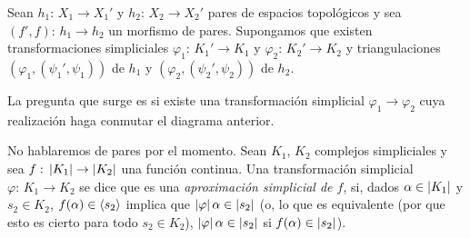 \theoremstyle{plain}
\newtheorem{teoExistenciaDeAproximaciones}{Teorema}[section]
\newtheorem{lemaDefinicionAproximacionSimplicial}%
	[teoExistenciaDeAproximaciones]{Lema}
\newtheorem{lemaAproximacionEsHomotopica}%
	[teoExistenciaDeAproximaciones]{Lema}
\newtheorem{teoCaracterizacionAproximacionesSimpliciales}%
	[teoExistenciaDeAproximaciones]{Teorema}
\newtheorem{coroAproximacionInducidaEnSubcomplejos}%
	[teoExistenciaDeAproximaciones]{Corolario}
\newtheorem{propoCaracterizacionDeAproximables}%
	[teoExistenciaDeAproximaciones]{Proposici\'{o}n}
\newtheorem{coroCaracterizacionDeAproximacionesPorSubdivision}%
	[teoExistenciaDeAproximaciones]{Corolario}

\theoremstyle{remark}
\newtheorem{obsDefinicionAproximacionSimplicial}%
	[teoExistenciaDeAproximaciones]{Observaci\'{o}n}
\newtheorem{obsAproximacionDeParesEsDePares}%
	[teoExistenciaDeAproximaciones]{Observaci\'{o}n}
\newtheorem{obsComposicionDeAproximacionesEsAproximacion}%
	[teoExistenciaDeAproximaciones]{Observaci\'{o}n}


Sean $h_{1}:\,X_{1}\rightarrow X_{1}'$ y $h_{2}:\,X_{2}\rightarrow X_{2}'$
pares de espacios topol\'{o}gicos y sea $(f',f):\,h_{1}\rightarrow h_{2}$ un
morfismo de pares. Supongamos que existen transformaciones simpliciales
$\varphi_{1}:\,K_{1}'\rightarrow K_{1}$ y
$\varphi_{2}:\,K_{2}'\rightarrow K_{2}$ y triangulaciones
$(\varphi_{1},(\psi_{1}',\psi_{1}))$ de $h_{1}$ y
$(\varphi_{2},(\psi_{2}',\psi_{2}))$ de $h_{2}$.
\begin{center}
\end{center}
La pregunta que surge es si existe una transformaci\'{o}n simplicial
$\varphi_{1}\rightarrow\varphi_{2}$ cuya realizaci\'{o}n haga conmutar el
diagrama anterior.

No hablaremos de pares por el momento. Sean $K_{1}$, $K_{2}$ complejos
simpliciales y sea $f:\,\left|K_{1}\right|\rightarrow\left|K_{2}\right|$ una funci\'{o}n
continua. Una transformaci\'{o}n simplicial $\varphi:\,K_{1}\rightarrow K_{2}$
se dice que es una \emph{aproximaci\'{o}n simplicial de $f$}, si, dados
$\alpha\in\left|K_{1}\right|$ y $s_{2}\in K_{2}$, $f(\alpha)\in\langle s_{2}\rangle$
implica que $\left|\varphi\right|\alpha\in\left|s_{2}\right|$ (o, lo que es equivalente
(por que esto es cierto para todo $s_{2}\in K_{2}$),
$\left|\varphi\right|\alpha\in\left|s_{2}\right|$ si $f(\alpha)\in\left|s_{2}\right|$).

